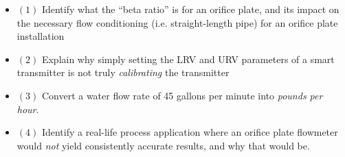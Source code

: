 \vskip 20pt

\begin{itemize}
\item{$(1)$} Identify what the ``beta ratio'' is for an orifice plate, and its impact on the necessary flow conditioning (i.e. straight-length pipe) for an orifice plate installation

\vskip 20pt

\item{$(2)$} Explain why simply setting the LRV and URV parameters of a smart transmitter is not truly {\it calibrating} the transmitter

\vskip 20pt

\item{$(3)$} Convert a water flow rate of 45 gallons per minute into {\it pounds per hour}.

\vskip 20pt

\item{$(4)$} Identify a real-life process application where an orifice plate flowmeter would {\it not} yield consistently accurate results, and why that would be.
\end{itemize}
 






